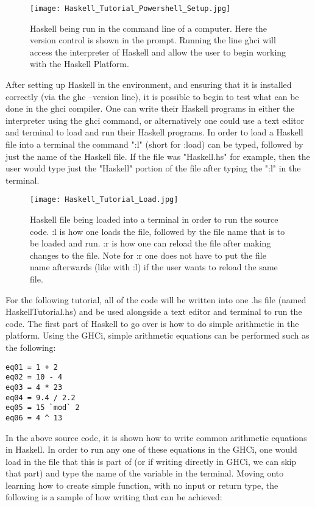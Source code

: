 \documentclass{article}
\begin{document}
\begin{figure}[htp]
    \centering
    \texttt{[image: Haskell\_Tutorial\_Powershell\_Setup.jpg]}
    \caption{Haskell being run in the command line of a computer. Here the version control is shown in the prompt. Running the line ghci will access the interpreter of Haskell and allow the user to begin working with the Haskell Platform.}
    \label{fig: Haskell in Command Line}
\end{figure}

\medskip\noindent
After setting up Haskell in the environment, and ensuring that it is installed correctly (via the ghc --version line), it is possible to begin to test what can be done in the ghci compiler. 
One can write their Haskell programs in either the interpreter using the ghci command, or alternatively one could use a text editor and terminal to load and run their Haskell programs.
In order to load a Haskell file into a terminal the command ":l" (short for :load) can be typed, followed by just the name of the Haskell file.
If the file was "Haskell.hs" for example, then the user would type just the "Haskell" portion of the file after typing the ":l" in the terminal.

\begin{figure}[htp]
    \centering
    \texttt{[image: Haskell\_Tutorial\_Load.jpg]}
    \caption{Haskell file being loaded into a terminal in order to run the source code. :l is how one loads the file, followed by the file name that is to be loaded and run. :r is how one can reload the file after making changes to the file. Note for :r one does not have to put the file name afterwards (like with :l) if the user wants to reload the same file.}
    \label{fig: Haskell in Command Line}
\end{figure}
For the following tutorial, all of the code will be written into one .hs file (named HaskellTutorial.hs) and be used alongside a text editor and terminal to run the code.
The first part of Haskell to go over is how to do simple arithmetic in the platform.
Using the GHCi, simple arithmetic equations can be performed such as the following:
\begin{lstlisting}
eq01 = 1 + 2
eq02 = 10 - 4
eq03 = 4 * 23
eq04 = 9.4 / 2.2
eq05 = 15 `mod` 2
eq06 = 4 ^ 13
\end{lstlisting}
In the above source code, it is shown how to write common arithmetic equations in Haskell. In order to run any one of these equations in the GHCi, one would load in the file that this is part of (or if writing directly in GHCi, we can skip that part) and type the name of the variable in the terminal.
Moving onto learning how to create simple function, with no input or return type, the following is a sample of how writing that can be achieved:
\end{document}
